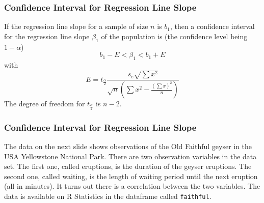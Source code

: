 \documentclass[xcolor=dvipsnames]{beamer}
\begin{document}


\begin{frame}
  \frametitle{Confidence Interval for Regression Line Slope}
  If the regression line slope for a sample of size $n$ is $b_{1}$,
  then a confidence interval for the regression line slope $\beta_{1}$
  of the population is (the confidence level being $1-\alpha$)
  \begin{equation}
    \label{eq:ooghiech}
    b_{1}-E<\beta_{1}<b_{1}+E
  \end{equation}
  with
  \begin{equation}
    \label{eq:ongiemas}
    E=t_{\frac{\alpha}{2}}\frac{s_{e}\sqrt{\sum{}x^{2}}}{\sqrt{n}\left(\sum{}x^{2}-\frac{\left(\sum{}x\right)^{2}}{n}\right)}
  \end{equation}
  The degree of freedom for $t_{\frac{\alpha}{2}}$ is $n-2$.
\end{frame}

\begin{frame}
  \frametitle{Confidence Interval for Regression Line Slope}
  The data on the next slide shows observations of the Old Faithful
  geyser in the USA Yellowstone National Park. There are two
  observation variables in the data set. The first one, called
  eruptions, is the duration of the geyser eruptions. The second one,
  called waiting, is the length of waiting period until the next
  eruption (all in minutes). It turns out there is a correlation
  between the two variables. The data is available on R Statistics in
  the dataframe called \texttt{faithful}.
\end{frame}
\end{document}
